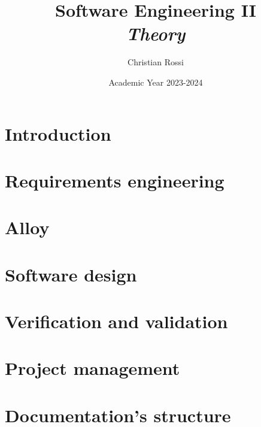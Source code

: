 \documentclass[12pt, a4paper]{report}
\title{Software Engineering II \\ \textit{Theory}}
\author{Christian Rossi}
\date{Academic Year 2023-2024}
\begin{document}
    \maketitle

    

    \cleardoublepage
    
    \tableofcontents

    \cleardoublepage

    \chapter{Introduction}
    
    
    
       

    \chapter{Requirements engineering}
    
    
    
      
    
    
    
     
     

    \chapter{Alloy}
    
    
    
    

    \chapter{Software design}
    
    
    
    
    
    

    \chapter{Verification and validation}
    
    
    
    

    \chapter{Project management}



    \chapter{Documentation's structure}
    
    
    
\end{document}
